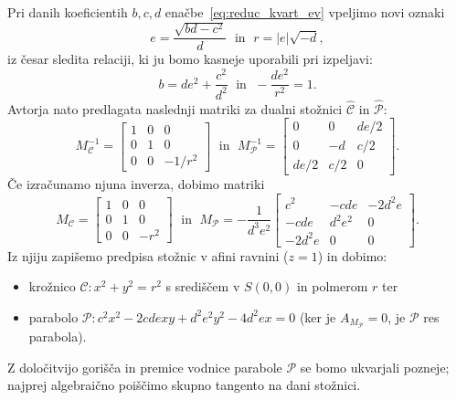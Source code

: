 Pri danih koeficientih $b, c, d$ enačbe~\ref{eq:reduc_kvart_ev} vpeljimo novi oznaki
$$ e = \frac{\sqrt{bd - c^2}}{d} \; \text{ in } \; r = |e|\sqrt{-d}, $$
iz česar sledita relaciji, ki ju bomo kasneje uporabili pri izpeljavi:
\begin{equation}
    \label{eq:kvarticni_relaciji}
    b= de^2 + \frac{c^2}{d^2} \; \text{ in } \; -\frac{de^2}{r^2} = 1.
\end{equation}
Avtorja nato predlagata naslednji matriki za dualni stožnici $\mathcal{\hat{C}}$ in $\mathcal{\hat{P}}$:
$$ M^{-1}_\mathcal{C} =
    \begin{bmatrix}
        1 & 0 & 0\\
        0 & 1 & 0\\
        0 & 0 & -1/r^2
    \end{bmatrix}
\; \text{ in } \; M^{-1}_\mathcal{P} =
    \begin{bmatrix}
        0 & 0 & de/2\\
        0 & -d & c/2\\
        de/2 & c/2 & 0
    \end{bmatrix}.
$$
Če izračunamo njuna inverza, dobimo matriki
$$ M_\mathcal{C} =
    \begin{bmatrix}
        1 & 0 & 0\\
        0 & 1 & 0\\
        0 & 0 & -r^2
    \end{bmatrix}
    \; \text{ in } \; M_\mathcal{P} = -\frac{1}{d^3e^2}
    \begin{bmatrix}
        c^2 & -cde & -2d^2e\\
        -cde & d^2e^2 & 0\\
        -2d^2e & 0 & 0
    \end{bmatrix}.
$$
Iz njiju zapišemo predpisa stožnic v afini ravnini ($z = 1$) in dobimo:
\begin{itemize}
    \item krožnico $\mathcal{C}: x^2 + y^2 = r^2$ s središčem v $S(0,0)$ in polmerom $r$ ter
    \item parabolo $\mathcal{P}: c^2x^2 - 2cdexy + d^2e^2y^2 - 4d^2ex = 0$ (ker je $A_{M_\mathcal{P}} = 0$, je $\mathcal{P}$ res parabola).
\end{itemize}
Z določitvijo gorišča in premice vodnice parabole $\mathcal{P}$ se bomo ukvarjali pozneje; najprej algebraično poiščimo skupno tangento na dani stožnici.

